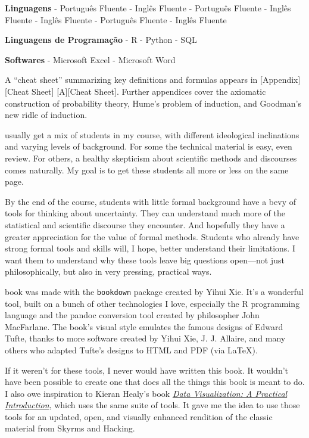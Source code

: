 \documentclass[justified]{tufte-book}
\begin{document}
\textbf{Linguagens}
- Português Fluente
- Inglês Fluente
- Português Fluente
- Inglês Fluente
- Inglês Fluente
- Português Fluente
- Inglês Fluente

\textbf{Linguagens de Programação}
- R
- Python
- SQL

\textbf{Softwares}
- Microsoft Excel
- Microsoft Word

A ``cheat sheet'' summarizing key definitions and formulas appears in {[}Appendix{]}{[}Cheat Sheet{]} {[}A{]}{[}Cheat Sheet{]}. Further appendices cover the axiomatic construction of probability theory, Hume's problem of induction, and Goodman's new ridle of induction.

 usually get a mix of students in my course, with different ideological inclinations and varying levels of background. For some the technical material is easy, even review. For others, a healthy skepticism about scientific methods and discourses comes naturally. My goal is to get these students all more or less on the same page.

By the end of the course, students with little formal background have a bevy of tools for thinking about uncertainty. They can understand much more of the statistical and scientific discourse they encounter. And hopefully they have a greater appreciation for the value of formal methods. Students who already have strong formal tools and skills will, I hope, better understand their limitations. I want them to understand why these tools leave big questions open---not just philosophically, but also in very pressing, practical ways.

 book was made with the \texttt{bookdown} package created by Yihui Xie. It's a wonderful tool, built on a bunch of other technologies I love, especially the R programming language and the pandoc conversion tool created by philosopher John MacFarlane. The book's visual style emulates the famous designs of Edward Tufte, thanks to more software created by Yihui Xie, J. J. Allaire, and many others who adapted Tufte's designs to HTML and PDF (via LaTeX).

If it weren't for these tools, I never would have written this book. It wouldn't have been possible to create one that does all the things this book is meant to do. I also owe inspiration to Kieran Healy's book \href{http://socviz.co/}{\emph{Data Visualization: A Practical Introduction}}, which uses the same suite of tools. It gave me the idea to use those tools for an updated, open, and visually enhanced rendition of the classic material from Skyrms and Hacking.
\end{document}
